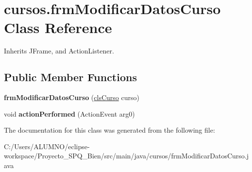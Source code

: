\hypertarget{classcursos_1_1frm_modificar_datos_curso}{}\section{cursos.\+frm\+Modificar\+Datos\+Curso Class Reference}
\label{classcursos_1_1frm_modificar_datos_curso}


Inherits J\+Frame, and Action\+Listener.

\subsection*{Public Member Functions}
\begin{DoxyCompactItemize}
\item 
\mbox{\label{classcursos_1_1frm_modificar_datos_curso_a1295f3961bba965375b6d1ff3db111e2}} 
{\bfseries frm\+Modificar\+Datos\+Curso} (\hyperlink{classcursos_1_1cls_curso}{cls\+Curso} curso)
\item 
\mbox{\label{classcursos_1_1frm_modificar_datos_curso_a521d52a10185758eecc5faacaf527bb7}} 
void {\bfseries action\+Performed} (Action\+Event arg0)
\end{DoxyCompactItemize}


The documentation for this class was generated from the following file\+:\begin{DoxyCompactItemize}
\item 
C\+:/\+Users/\+A\+L\+U\+M\+N\+O/eclipse-\/workspace/\+Proyecto\+\_\+\+S\+P\+Q\+\_\+Bien/src/main/java/cursos/frm\+Modificar\+Datos\+Curso.\+java\end{DoxyCompactItemize}
